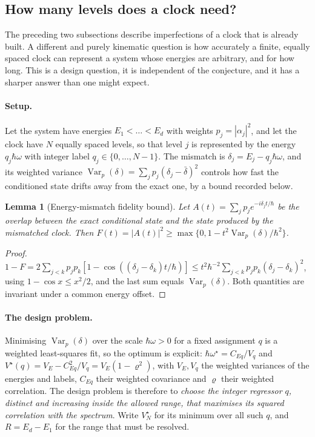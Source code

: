 \documentclass[aps,prd,onecolumn,notitlepage,10pt,amsmath,amssymb,amsfonts,nofootinbib]{revtex4-2}
\newtheorem{lemma}{Lemma}
\theoremstyle{definition}
\theoremstyle{remark}
\begin{document}
\subsection{How many levels does a clock need?}
\label{sec:levels}
The preceding two subsections describe imperfections of a clock that is already built. A different and purely kinematic question is how accurately a finite, equally spaced clock can represent a system whose energies are arbitrary, and for how long. This is a design question, it is independent of the conjecture, and it has a sharper answer than one might expect.

\paragraph*{Setup.}
Let the system have energies $E_1<\dots<E_d$ with weights $p_j=|\alpha_j|^2$, and let the clock have $N$ equally spaced levels, so that level $j$ is represented by the energy $q_j\hbar\omega$ with integer label $q_j\in\{0,\dots,N-1\}$. The mismatch is $\delta_j=E_j-q_j\hbar\omega$, and its weighted variance $\operatorname{Var}_p(\delta)=\sum_jp_j(\delta_j-\bar\delta)^2$ controls how fast the conditioned state drifts away from the exact one, by a bound recorded below.

\begin{lemma}[Energy-mismatch fidelity bound]
\label{lem:fidbound}
Let $A(t)=\sum_jp_je^{-i\delta_jt/\hbar}$ be the overlap between the exact conditional state and the state produced by the mismatched clock. Then $F(t)=|A(t)|^2\ge\max\{0,1-t^2\operatorname{Var}_p(\delta)/\hbar^2\}$.
\end{lemma}
\begin{proof}
$1-F=2\sum_{j<k}p_jp_k[1-\cos((\delta_j-\delta_k)t/\hbar)]\le t^2\hbar^{-2}\sum_{j<k}p_jp_k(\delta_j-\delta_k)^2$, using $1-\cos x\le x^2/2$, and the last sum equals $\operatorname{Var}_p(\delta)$. Both quantities are invariant under a common energy offset.
\end{proof}

\paragraph*{The design problem.}
Minimising $\operatorname{Var}_p(\delta)$ over the scale $\hbar\omega>0$ for a fixed assignment $q$ is a weighted least-squares fit, so the optimum is explicit: $\hbar\omega^\star=C_{Eq}/V_q$ and $V^\star(q)=V_E-C_{Eq}^2/V_q=V_E(1-\varrho^2)$, with $V_E,V_q$ the weighted variances of the energies and labels, $C_{Eq}$ their weighted covariance and $\varrho$ their weighted correlation. The design problem is therefore to \emph{choose the integer regressor $q$, distinct and increasing inside the allowed range, that maximises its squared correlation with the spectrum}. Write $V^\star_N$ for its minimum over all such $q$, and $R=E_d-E_1$ for the range that must be resolved.
\end{document}
